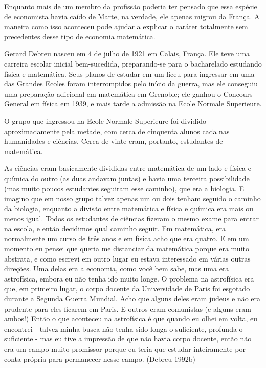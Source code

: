 \documentclass[a4paper,12pt]{article}[abntex2]
\begin{document}
Enquanto mais de um membro da profissão poderia ter pensado que essa espécie de economista havia caído de Marte, na verdade, ele apenas migrou da França. A maneira como isso aconteceu pode ajudar a explicar o caráter totalmente sem precedentes desse tipo de economia matemática.

Gerard Debreu nasceu em 4 de julho de 1921 em Calais, França. Ele teve uma carreira escolar inicial bem-sucedida, preparando-se para o bacharelado estudando física e matemática. Seus planos de estudar em um liceu para ingressar em uma das Grandes Ecoles foram interrompidos pelo início da guerra, mas ele conseguiu uma preparação adicional em matemática em Grenoble; ele ganhou o Concours General em física em 1939, e mais tarde a admissão na Ecole Normale Superieure.

O grupo que ingressou na Ecole Normale Superieure foi dividido aproximadamente pela metade, com cerca de cinquenta alunos cada nas humanidades e ciências. Cerca de vinte eram, portanto, estudantes de matemática.

As ciências eram basicamente divididas entre matemática de um lado e física e química do outro (as duas andavam juntas) e havia uma terceira possibilidade (mas muito poucos estudantes seguiram esse caminho), que era a biologia. E imagino que em nosso grupo talvez apenas um ou dois tenham seguido o caminho da biologia, enquanto a divisão entre matemática e física e química era mais ou menos igual. Todos os estudantes de ciências fizeram o mesmo exame para entrar na escola, e então decidimos qual caminho seguir. Em matemática, era normalmente um curso de três anos e em física acho que era quatro. E em um momento eu pensei que queria me distanciar da matemática porque era muito abstrata, e como escrevi em outro lugar eu estava interessado em várias outras direções. Uma delas era a economia, como você bem sabe, mas uma era astrofísica, embora eu não tenha ido muito longe. O problema na astrofísica era que, em primeiro lugar, o corpo docente da Universidade de Paris foi esgotado durante a Segunda Guerra Mundial. Acho que alguns deles eram judeus e não era prudente para eles ficarem em Paris. E outros eram comunistas (e alguns eram ambos!) Então o que aconteceu na astrofísica é que quando eu olhei em volta, eu encontrei - talvez minha busca não tenha sido longa o suficiente, profunda o suficiente - mas eu tive a impressão de que não havia corpo docente, então não era um campo muito promissor porque eu teria que estudar inteiramente por conta própria para permanecer nesse campo. (Debreu 1992b)
\end{document}
